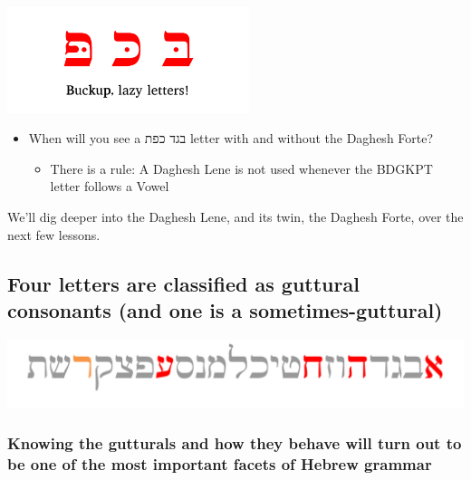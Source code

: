 \documentclass[
]{turabian-researchpaper}
\providecommand{\tightlist}{%
  \setlength{\itemsep}{0pt}\setlength{\parskip}{0pt}}
\begin{document}
\begin{center}\includegraphics[width=200pt]{images/buckup} \end{center}

\begin{itemize}
\tightlist
\item
  When will you see a בגד כפת letter with and without the Daghesh Forte?

  \begin{itemize}
  \tightlist
  \item
    There is a rule: A Daghesh Lene is not used whenever the BDGKPT letter follows a Vowel
  \end{itemize}
\end{itemize}

We'll dig deeper into the Daghesh Lene, and its twin, the Daghesh Forte, over the next few lessons.

\hypertarget{one_5}{%
\subsection{Four letters are classified as guttural consonants (and one is a sometimes-guttural)}\label{one_5}}

\begin{center}\includegraphics[width=500pt]{images/gutturals} \end{center}

\hypertarget{knowing-the-gutturals-and-how-they-behave-will-turn-out-to-be-one-of-the-most-important-facets-of-hebrew-grammar}{%
\subsubsection*{Knowing the gutturals and how they behave will turn out to be one of the most important facets of Hebrew grammar}\label{knowing-the-gutturals-and-how-they-behave-will-turn-out-to-be-one-of-the-most-important-facets-of-hebrew-grammar}}
\end{document}
